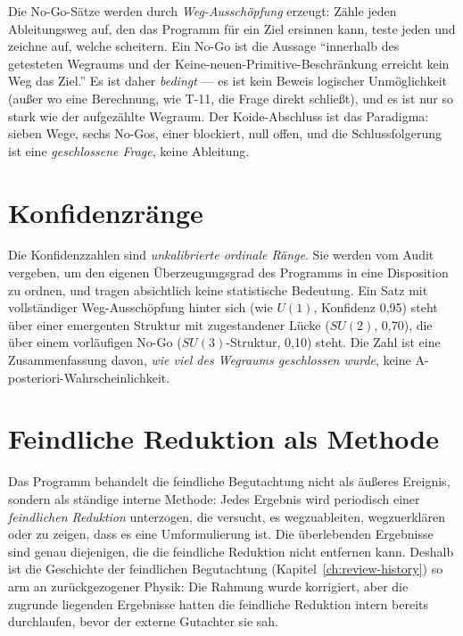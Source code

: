 \documentclass[10pt,twoside,openany]{book}
\begin{document}
Die No-Go-Sätze werden durch \emph{Weg-Ausschöpfung} erzeugt: Zähle jeden
Ableitungsweg auf, den das Programm für ein Ziel ersinnen kann, teste jeden und zeichne
auf, welche scheitern. Ein No-Go ist die Aussage ``innerhalb des getesteten Wegraums und
der Keine-neuen-Primitive-Beschränkung erreicht kein Weg das Ziel.'' Es ist daher
\emph{bedingt} --- es ist kein Beweis logischer Unmöglichkeit (außer wo eine Berechnung,
wie T-11, die Frage direkt schließt), und es ist nur so stark wie der aufgezählte
Wegraum. Der Koide-Abschluss ist das Paradigma: sieben Wege, sechs No-Gos, einer
blockiert, null offen, und die Schlussfolgerung ist eine \emph{geschlossene Frage}, keine
Ableitung.

\section{Konfidenzränge}

Die Konfidenzzahlen sind \emph{unkalibrierte ordinale Ränge}. Sie werden vom Audit
vergeben, um den eigenen Überzeugungsgrad des Programms in eine Disposition zu ordnen,
und tragen absichtlich keine statistische Bedeutung. Ein Satz mit vollständiger
Weg-Ausschöpfung hinter sich (wie $U(1)$, Konfidenz 0,95) steht über einer emergenten
Struktur mit zugestandener Lücke ($SU(2)$, 0,70), die über einem vorläufigen No-Go
($SU(3)$-Struktur, 0,10) steht. Die Zahl ist eine Zusammenfassung davon, \emph{wie viel
des Wegraums geschlossen wurde}, keine A-posteriori-Wahrscheinlichkeit.

\section{Feindliche Reduktion als Methode}

Das Programm behandelt die feindliche Begutachtung nicht als äußeres Ereignis, sondern
als ständige interne Methode: Jedes Ergebnis wird periodisch einer \emph{feindlichen
Reduktion} unterzogen, die versucht, es wegzuableiten, wegzuerklären oder zu zeigen, dass
es eine Umformulierung ist. Die überlebenden Ergebnisse sind genau diejenigen, die die
feindliche Reduktion nicht entfernen kann. Deshalb ist die Geschichte der feindlichen
Begutachtung (Kapitel~\ref{ch:review-history}) so arm an zurückgezogener Physik: Die
Rahmung wurde korrigiert, aber die zugrunde liegenden Ergebnisse hatten die feindliche
Reduktion intern bereits durchlaufen, bevor der externe Gutachter sie sah.

\end{document}
